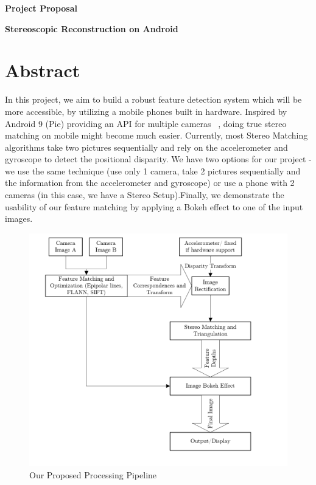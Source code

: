 \documentclass[a4paper,pagesize 10pt]{scrartcl}
\begin{document}
\begin{center}{\Huge\textbf{Project Proposal}}\end{center}

\begin{center}{\Large\textbf{Stereoscopic Reconstruction on Android}}\end{center}


\section{Abstract}

%
%
%
%
%
In this project, we aim to build a robust feature detection system which will be more accessible, by utilizing a mobile phones built in hardware. Inspired by Android 9 (Pie)
providing an API for multiple cameras ~\cite{AndroidPMultiCamera}, doing true stereo matching on mobile might become much easier. Currently, most Stereo Matching algorithms take two pictures sequentially and rely on the accelerometer and gyroscope to detect the positional disparity. We have two options for our project - we use the same technique (use only 1 camera, take 2 pictures sequentially and the information from the accelerometer and gyroscope) or use a phone with 2 cameras (in this case, we have a Stereo Setup).Finally, we demonstrate the usability of our feature matching by applying a Bokeh effect to one of the input images.
\begin{figure}[h]
	\centering
	\includegraphics[scale=0.55]{Pipeline.PNG}
	\caption{Our Proposed Processing Pipeline}
\end{figure}
\end{document}
